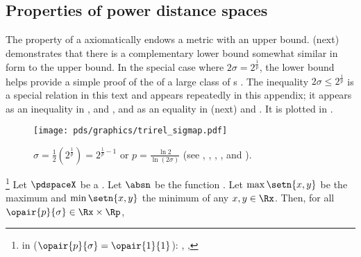 \subsection{Properties of power distance spaces}
\label{sec:pdspace_propd}
The  property of a 
axiomatically endows a metric with an upper bound. 
 (next) demonstrates that there is a complementary lower bound 
somewhat similar in form to the  upper bound.
In the special case where $2\sigma=2^\frac{1}{p}$, 
the lower bound helps provide a simple proof of the  of 
a large class of s .
The inequality $2\sigma\le2^\frac{1}{p}$ is a special relation in this text and appears repeatedly in this appendix;
it appears as an inequality in ,  and ,
and as an equality in  (next) and .
It is plotted in .
\begin{figure}[t]
  \footnotesize%
  \centering%
  \texttt{[image: pds/graphics/trirel\_sigmap.pdf]}
  \caption{$\sigma = \frac{1}{2}(2^{\frac{1}{p}}) = 2^{\frac{1}{p}-1}$ or $p=\frac{\ln2}{\ln(2\sigma)}$ 
  \label{fig:sigmap}
  \scs(see , , , , and ).
  }
\end{figure}
\begin{lemma}
\footnote{
  in  ($\opair{p}{\sigma}=\opair{1}{1}$):
  ,
  ,
  }
\label{lem:pdspace_ineq}
Let $\pdspaceX$ be a  . 
Let $\absn$ be the  function .
Let $\max\setn{x,y}$ be the maximum and $\min\setn{x,y}$ the minimum of any $x,y\in\Rx$.
Then, for all $\opair{p}{\sigma}\in\Rx\times\Rp$,
\end{lemma}

